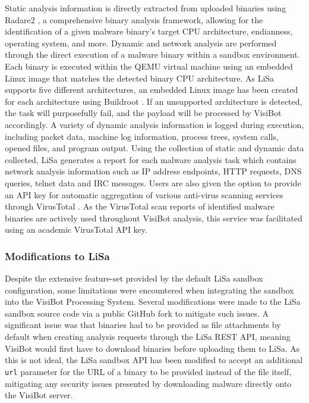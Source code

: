Static analysis information is directly extracted from uploaded binaries using Radare2 \citep{Radare2}, a comprehensive binary analysis framework, allowing for the identification of a given malware binary's target CPU architecture, endianness, operating system, and more. Dynamic and network analysis are performed through the direct execution of a malware binary within a sandbox environment. Each binary is executed within the QEMU virtual machine \citep{Qemu} using an embedded Linux image that matches the detected binary CPU architecture. As LiSa supports five different architectures, an embedded Linux image has been created for each architecture using Buildroot \citep{Buildroot}. If an unsupported architecture is detected, the task will purposefully fail, and the payload will be processed by VisiBot accordingly. A variety of dynamic analysis information is logged during execution, including packet data, machine log information, process trees, system calls, opened files, and program output. Using the collection of static and dynamic data collected, LiSa generates a report for each malware analysis task which contains network analysis information such as IP address endpoints, HTTP requests, DNS queries, telnet data and IRC messages. Users are also given the option to provide an API key for automatic aggregation of various anti-virus scanning services through VirusTotal \citep{VirusTotal}. As the VirusTotal scan reports of identified malware binaries are actively used throughout VisiBot analysis, this service was facilitated using an academic VirusTotal API key.

\subsubsection{Modifications to LiSa}

Despite the extensive feature-set provided by the default LiSa sandbox configuration, some limitations were encountered when integrating the sandbox into the VisiBot Processing System. Several modifications were made to the LiSa sandbox source code via a public GitHub fork \citep{LiSaModified} to mitigate such issues. A significant issue was that binaries had to be provided as file attachments by default when creating analysis requests through the LiSa REST API, meaning VisiBot would first have to download binaries before uploading them to LiSa. As this is not ideal, the LiSa sandbox API has been modified to accept an additional \texttt{url} parameter for the URL of a binary to be provided instead of the file itself, mitigating any security issues presented by downloading malware directly onto the VisiBot server.

